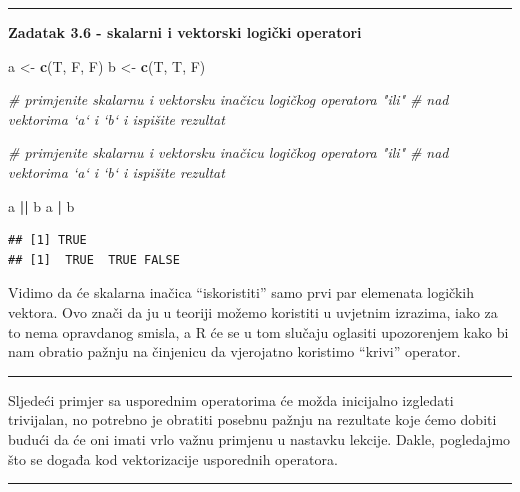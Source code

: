 \documentclass[]{book}
\newenvironment{Shaded}{\begin{snugshade}}{\end{snugshade}}
\newcommand{\KeywordTok}[1]{\textcolor[rgb]{0.13,0.29,0.53}{\textbf{#1}}}
\newcommand{\StringTok}[1]{\textcolor[rgb]{0.31,0.60,0.02}{#1}}
\newcommand{\CommentTok}[1]{\textcolor[rgb]{0.56,0.35,0.01}{\textit{#1}}}
\newcommand{\OperatorTok}[1]{\textcolor[rgb]{0.81,0.36,0.00}{\textbf{#1}}}
\newcommand{\NormalTok}[1]{#1}
\theoremstyle{definition}
\theoremstyle{definition}
\theoremstyle{definition}
\theoremstyle{remark}
\begin{document}
\begin{center}\rule{0.5\linewidth}{\linethickness}\end{center}

\textbf{Zadatak 3.6 - skalarni i vektorski logički operatori}

\begin{Shaded}
\begin{Highlighting}[]
\NormalTok{a <-}\StringTok{ }\KeywordTok{c}\NormalTok{(T, F, F)}
\NormalTok{b <-}\StringTok{ }\KeywordTok{c}\NormalTok{(T, T, F)}

\CommentTok{# primjenite skalarnu i vektorsku inačicu logičkog operatora "ili"}
\CommentTok{# nad vektorima `a` i `b` i ispišite rezultat}
\end{Highlighting}
\end{Shaded}

\begin{Shaded}
\begin{Highlighting}[]
\CommentTok{# primjenite skalarnu i vektorsku inačicu logičkog operatora "ili"}
\CommentTok{# nad vektorima `a` i `b` i ispišite rezultat}

\NormalTok{a }\OperatorTok{||}\StringTok{ }\NormalTok{b}
\NormalTok{a }\OperatorTok{|}\StringTok{ }\NormalTok{b}
\end{Highlighting}
\end{Shaded}

\begin{verbatim}
## [1] TRUE
## [1]  TRUE  TRUE FALSE
\end{verbatim}

Vidimo da će skalarna inačica ``iskoristiti'' samo prvi par elemenata
logičkih vektora. Ovo znači da ju u teoriji možemo koristiti u uvjetnim
izrazima, iako za to nema opravdanog smisla, a R će se u tom slučaju
oglasiti upozorenjem kako bi nam obratio pažnju na činjenicu da
vjerojatno koristimo ``krivi'' operator.

\begin{center}\rule{0.5\linewidth}{\linethickness}\end{center}

Sljedeći primjer sa usporednim operatorima će možda inicijalno izgledati
trivijalan, no potrebno je obratiti posebnu pažnju na rezultate koje
ćemo dobiti budući da će oni imati vrlo važnu primjenu u nastavku
lekcije. Dakle, pogledajmo što se događa kod vektorizacije usporednih
operatora.

\begin{center}\rule{0.5\linewidth}{\linethickness}\end{center}
\end{document}
